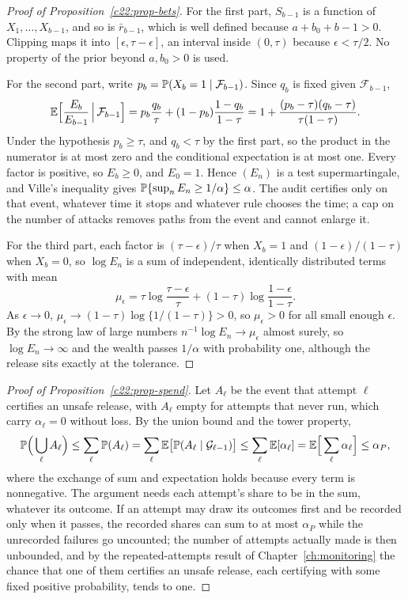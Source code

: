 \begin{proof}[Proof of Proposition~\ref{c22:prop-bets}]
For the first part, $S_{b-1}$ is a function of $X_1,\dots,X_{b-1}$, and so is $\bar r_{b-1}$, which is well defined because $a+b_0+b-1>0$.
Clipping maps it into $[\epsilon,\tau-\epsilon]$, an interval inside $(0,\tau)$ because $\epsilon<\tau/2$. No property of the prior beyond $a,b_0>0$ is used.

For the second part, write $p_b=\mathbb{P}(X_b=1\mid\mathcal F_{b-1})$. Since $q_b$ is fixed given $\mathcal F_{b-1}$,
\[\mathbb{E}\Big[\frac{E_b}{E_{b-1}}\,\Big|\,\mathcal F_{b-1}\Big]=p_b\frac{q_b}\tau+(1-p_b)\frac{1-q_b}{1-\tau}=1+\frac{(p_b-\tau)(q_b-\tau)}{\tau(1-\tau)}.\]
Under the hypothesis $p_b\ge\tau$, and $q_b<\tau$ by the first part, so the product in the numerator is at most zero and the
conditional expectation is at most one. Every factor is positive, so $E_b\ge0$, and $E_0=1$. Hence $(E_n)$ is a test
supermartingale, and Ville's inequality gives $\mathbb{P}\{\sup_nE_n\ge1/\alpha\}\le\alpha$. The audit certifies only on that event,
whatever time it stops and whatever rule chooses the time; a cap on the number of attacks removes paths from the event
and cannot enlarge it.

For the third part, each factor is $(\tau-\epsilon)/\tau$ when $X_b=1$ and $(1-\epsilon)/(1-\tau)$ when $X_b=0$, so $\log E_n$ is a sum of
independent, identically distributed terms with mean
\[\mu_\epsilon=\tau\log\frac{\tau-\epsilon}\tau+(1-\tau)\log\frac{1-\epsilon}{1-\tau}.\]
As $\epsilon\to0$, $\mu_\epsilon\to(1-\tau)\log\{1/(1-\tau)\}>0$, so $\mu_\epsilon>0$ for all small enough $\epsilon$. By the strong law of large numbers
$n^{-1}\log E_n\to\mu_\epsilon$ almost surely, so $\log E_n\to\infty$ and the wealth passes $1/\alpha$ with probability one, although the
release sits exactly at the tolerance.
\end{proof}

\begin{proof}[Proof of Proposition~\ref{c22:prop-spend}]
Let $A_\ell$ be the event that attempt $\ell$ certifies an unsafe release, with $A_\ell$ empty for attempts that never run, which
carry $\alpha_\ell=0$ without loss. By the union bound and the tower property,
\[\mathbb{P}\Big(\bigcup_\ell A_\ell\Big)\le\sum_\ell\mathbb{P}(A_\ell)=\sum_\ell\mathbb{E}\big[\mathbb{P}(A_\ell\mid\mathcal G_{\ell-1})\big]\le\sum_\ell\mathbb{E}[\alpha_\ell]=\mathbb{E}\Big[\sum_\ell\alpha_\ell\Big]\le\alpha_P,\]
where the exchange of sum and expectation holds because every term is nonnegative. The argument needs each attempt's
share to be in the sum, whatever its outcome. If an attempt may draw its outcomes first and be recorded only when it
passes, the recorded shares can sum to at most $\alpha_P$ while the unrecorded failures go uncounted; the number of attempts
actually made is then unbounded, and by the repeated-attempts result of Chapter~\ref{ch:monitoring} the chance that one of them
certifies an unsafe release, each certifying with some fixed positive probability, tends to one.
\end{proof}
